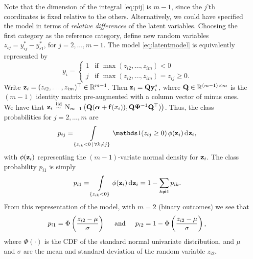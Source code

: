 Note that the dimension of the integral \eqref{eq:pij} is $m-1$, since the $j$'th coordinates is fixed relative to the others.
Alternatively, we could have specified the model in terms of \emph{relative differences} of the latent variables.
Choosing the first category as the reference category, define new random variables $z_{ij} = y_{ij}^* - y_{i1}^*$, for $j = 2,\dots,m-1$. 
The model \cref{eq:latentmodel} is equivalently represented by
\begin{equation}
  y_i = 
  \begin{cases}
    1 & \text{if } \max (z_{i2},\dots,z_{im}) < 0 \\
    j & \text{if } \max (z_{i2},\dots,z_{im}) = z_{ij} \geq 0.
  \end{cases}
\end{equation} 
Write ${\mathbf z}_i = (z_{i2},\dots,z_{im})^\top \in \mathbb{R}^{m-1}$.
Then ${\mathbf z}_i = {\mathbf Q}{\mathbf y}^*_i$, where ${\mathbf Q} \in \mathbb{R}^{(m-1)\times m}$  is the $(m-1)$ identity matrix pre-augmented with a column vector of minus ones.
We have that ${\mathbf z}_i \,\overset{\text{iid}}{\sim}\, \operatorname{N}_{m-1}\big({\mathbf Q}({\bm\alpha} + {\mathbf f}(x_i)), {\mathbf Q}{\bm\Psi}^{-1}{\mathbf Q}^\top)\big)$.
Thus, the class probabilities for $j=2,\dots,m$ are
\begin{align}
  p_{ij} = 
  \int\displaylimits_{\{z_{ik} < 0 \,|\, \forall k \neq j \}} \ind(z_{ij} \geq 0) \,\phi(\bz_i) \dint\bz_i \label{eq:pij2},
\end{align}
with $\phi({\mathbf z}_i)$ representing the $(m-1)$-variate normal density for ${\mathbf z}_i$.
The class probability $p_{i1}$ is simply
\[
  p_{i1} = \int\displaylimits_{\{ z_{ik} <0 \}}  \phi({\mathbf z}_i) \operatorname{d}\hspace{0.5pt}\!{\mathbf z}_i = 1 - \sum_{k\neq 1} p_{ik}.
\]
From this representation of the model, with $m=2$ (binary outcomes) we see that
\[
  p_{i1} = 
  \Phi \left( \frac{z_{i2} - \mu}{\sigma} \right)
  \hspace{0.5cm}\text{and}\hspace{0.5cm}
  p_{i2} = 
  1 - \Phi \left( \frac{z_{i2} - \mu}{\sigma} \right),
\]
where $\Phi(\cdot)$ is the CDF of the standard normal univariate distribution, and $\mu$ and $\sigma$ are the mean and standard deviation of the random variable $z_{i2}$.

